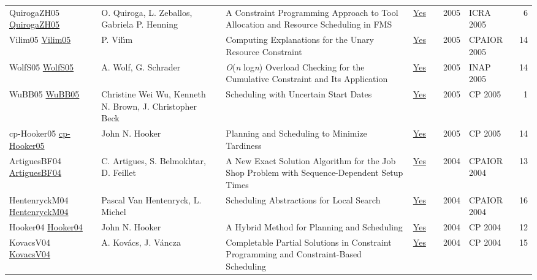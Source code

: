 {\begin{longtable}{p{3cm}p{6cm}p{7cm}rrrp{3cm}r}
QuirogaZH05 \href{https://doi.org/10.1109/ROBOT.2005.1570686}{QuirogaZH05} & O. Quiroga, L. Zeballos, Gabriela P. Henning & A Constraint Programming Approach to Tool Allocation and Resource Scheduling in {FMS} & \href{papers/QuirogaZH05.pdf}{Yes} & \cite{QuirogaZH05} & 2005 & ICRA 2005 & 6\\
Vilim05 \href{https://doi.org/10.1007/11493853\_29}{Vilim05} & P. Vil{\'{\i}}m & Computing Explanations for the Unary Resource Constraint & \href{papers/Vilim05.pdf}{Yes} & \cite{Vilim05} & 2005 & CPAIOR 2005 & 14\\
WolfS05 \href{https://doi.org/10.1007/11963578\_8}{WolfS05} & A. Wolf, G. Schrader & \emph{O}(\emph{n} log\emph{n}) Overload Checking for the Cumulative Constraint and Its Application & \href{papers/WolfS05.pdf}{Yes} & \cite{WolfS05} & 2005 & INAP 2005 & 14\\
WuBB05 \href{https://doi.org/10.1007/11564751\_110}{WuBB05} & Christine Wei Wu, Kenneth N. Brown, J. Christopher Beck & Scheduling with Uncertain Start Dates & \href{papers/WuBB05.pdf}{Yes} & \cite{WuBB05} & 2005 & CP 2005 & 1\\
cp-Hooker05 \href{https://doi.org/10.1007/11564751\_25}{cp-Hooker05} & John N. Hooker & Planning and Scheduling to Minimize Tardiness & \href{papers/cp-Hooker05.pdf}{Yes} & \cite{cp-Hooker05} & 2005 & CP 2005 & 14\\
ArtiguesBF04 \href{https://doi.org/10.1007/978-3-540-24664-0\_3}{ArtiguesBF04} & C. Artigues, S. Belmokhtar, D. Feillet & A New Exact Solution Algorithm for the Job Shop Problem with Sequence-Dependent Setup Times & \href{papers/ArtiguesBF04.pdf}{Yes} & \cite{ArtiguesBF04} & 2004 & CPAIOR 2004 & 13\\
HentenryckM04 \href{https://doi.org/10.1007/978-3-540-24664-0\_22}{HentenryckM04} & Pascal Van Hentenryck, L. Michel & Scheduling Abstractions for Local Search & \href{papers/HentenryckM04.pdf}{Yes} & \cite{HentenryckM04} & 2004 & CPAIOR 2004 & 16\\
Hooker04 \href{https://doi.org/10.1007/978-3-540-30201-8\_24}{Hooker04} & John N. Hooker & A Hybrid Method for Planning and Scheduling & \href{papers/Hooker04.pdf}{Yes} & \cite{Hooker04} & 2004 & CP 2004 & 12\\
KovacsV04 \href{https://doi.org/10.1007/978-3-540-30201-8\_26}{KovacsV04} & A. Kov{\'{a}}cs, J. V{\'{a}}ncza & Completable Partial Solutions in Constraint Programming and Constraint-Based Scheduling & \href{papers/KovacsV04.pdf}{Yes} & \cite{KovacsV04} & 2004 & CP 2004 & 15\\

\end{longtable}}
